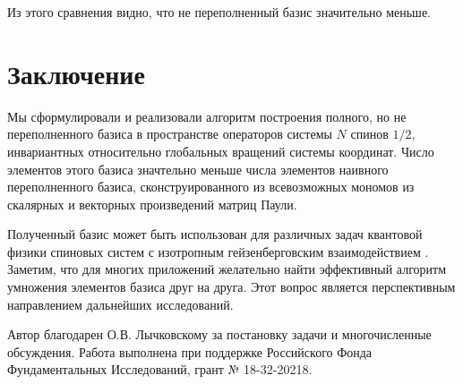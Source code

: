 \documentclass[]{article}
\renewcommand{\[}{\begin{equation}}
\renewcommand{\]}{\end{equation}}
\begin{document}
\bigskip

%
\noindent Из этого сравнения видно, что не переполненный базис значительно меньше.

\section{Заключение}
Мы сформулировали и реализовали алгоритм построения полного, но не переполненного базиса в пространстве операторов системы $N$ спинов $1/2$, инвариантных относительно глобальных вращений системы координат.  Число элементов этого базиса значтельно меньше числа элементов наивного переполненного базиса, сконструированного из всевозможных мономов из скалярных и векторных произведений матриц Паули.

Полученный базис может быть использован для различных задач квантовой физики спиновых систем с изотропным гейзенберговским взаимодействием \cite{USH,variational,kvadro,basisF}.  Заметим, что для многих приложений желательно найти эффективный алгоритм умножения элементов базиса друг на друга. Этот вопрос является перспективным направлением дальнейших исследований.

\bigskip

 Автор благодарен О.В. Лычковскому за постановку задачи и многочисленные обсуждения. Работа выполнена при поддержке Российского Фонда Фундаментальных Исследований, грант № 18-32-20218.
\end{document}
